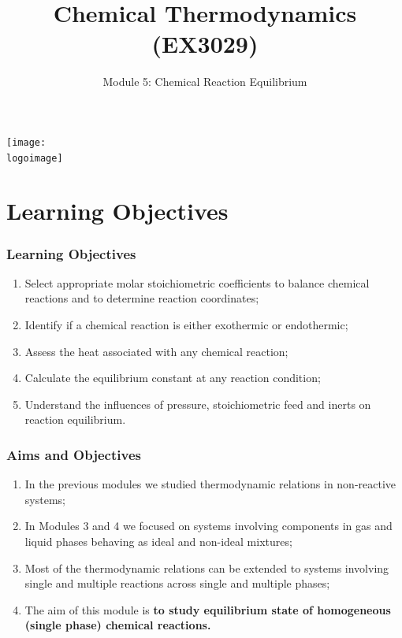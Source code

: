 \documentclass[10pt,compress,handout,unknownkeysallowed]{beamer}
\institute{School of Engineering}
\title{Chemical Thermodynamics (EX3029)}
\subtitle{Module 5: Chemical Reaction Equilibrium}
\date[ ]{ }
\newcommand{\logoimage}{../../FigBanner/UoAHorizBanner}
\begin{document}
\begin{frame}
  \titlepage
  \vfill%
  \begin{center}
    \texttt{[image: \\logoimage]}
  \end{center}
\end{frame}




\section{Learning Objectives}

\begin{frame}
 \frametitle{Learning Objectives}
   \begin{enumerate}
     \item Select appropriate molar stoichiometric coefficients to balance chemical reactions and to determine reaction coordinates;
     \item Identify if a chemical reaction is either exothermic or endothermic;
     \item Assess the heat associated with any chemical reaction;
     \item Calculate the equilibrium constant at any reaction condition;
     \item Understand the influences of pressure, stoichiometric feed and inerts on reaction equilibrium.
   \end{enumerate}
\end{frame}

\begin{frame}
 \frametitle{Aims and Objectives}
   \begin{enumerate}
     \item<1-> In the previous modules we studied thermodynamic relations in non-reactive systems;
     \item<1-> In Modules 3 and 4 we focused on systems involving components in gas and liquid phases behaving as ideal and non-ideal mixtures;
     \item<2-> Most of the thermodynamic relations can be extended to systems involving single and multiple reactions across single and multiple phases;
     \item<2-> The aim of this module is {\bf to study equilibrium state of homogeneous (\ie single phase) chemical reactions.}
   \end{enumerate}
\end{frame}
\end{document}
